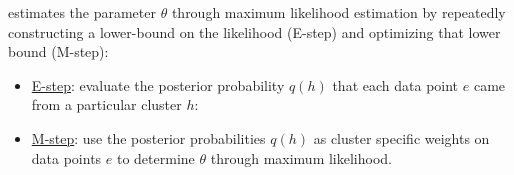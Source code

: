  estimates the parameter $\theta$ through
maximum likelihood estimation by repeatedly constructing a lower-bound on the
likelihood (E-step) and optimizing that lower bound (M-step):
\begin{itemize}
    \item \underline{E-step}: evaluate the posterior probability $q(h)$ that
        each data point $e$ came from a particular cluster $h$:
    \item \underline{M-step}: use the posterior probabilities $q(h)$ as cluster
        specific weights on data points $e$ to determine $\theta$ through
        maximum likelihood.
\end{itemize}
